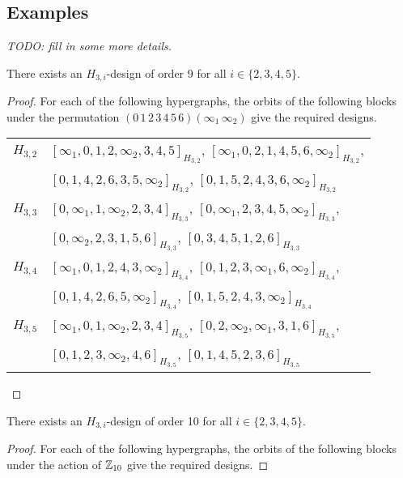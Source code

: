 \begin{subappendices}

\section{Examples} \label{section:examples}

{\em TODO: fill in some more details.}

\begin{example} \label{eg:H_3i-9}
There exists an $H_{3,i}$-design of order 9 for all $i \in \{2,3,4,5\}$.
\end{example}

\begin{proof}
For each of the following hypergraphs, the orbits of the following blocks under
the permutation $(0 \, 1 \, 2 \, 3 \, 4 \, 5 \, 6)(\infty_1 \, \infty_2)$ give the required designs.

\begin{tabular}{|c|l|}
\hline
$H_{3,2}$ &
  $[\infty_1, 0, 1, 2, \infty_2, 3, 4, 5]_{H_{3,2}}$,
  $[\infty_1, 0, 2, 1, 4, 5, 6, \infty_2]_{H_{3,2}}$, \\ &
  $[0, 1, 4, 2, 6, 3, 5, \infty_2]_{H_{3,2}}$,
  $[0, 1, 5, 2, 4, 3, 6, \infty_2]_{H_{3,2}}$
\\ \hline
$H_{3,3}$ &
  $[0, \infty_1, 1, \infty_2, 2, 3, 4]_{H_{3,3}}$,
  $[0, \infty_1, 2, 3, 4, 5, \infty_2]_{H_{3,3}}$, \\ &
  $[0, \infty_2, 2, 3, 1, 5, 6]_{H_{3,3}}$,
  $[0, 3, 4, 5, 1, 2, 6]_{H_{3,3}}$
\\ \hline
$H_{3,4}$ &
  $[\infty_1, 0, 1, 2, 4, 3, \infty_2]_{H_{3,4}}$,
  $[0, 1, 2, 3, \infty_1, 6, \infty_2]_{H_{3,4}}$, \\ &
  $[0, 1, 4, 2, 6, 5, \infty_2]_{H_{3,4}}$,
  $[0, 1, 5, 2, 4, 3, \infty_2]_{H_{3,4}}$
\\ \hline
$H_{3,5}$ &
  $[\infty_1, 0, 1, \infty_2, 2, 3, 4]_{H_{3,5}}$,
  $[0, 2, \infty_2, \infty_1, 3, 1, 6]_{H_{3,5}}$, \\ &
  $[0, 1, 2, 3, \infty_2, 4, 6]_{H_{3,5}}$,
  $[0, 1, 4, 5, 2, 3, 6]_{H_{3,5}}$
\\ \hline
\end{tabular}
\end{proof}


\begin{example} \label{eg:H_3i-10}
There exists an $H_{3,i}$-design of order 10 for all $i \in \{2,3,4,5\}$.
\end{example}

\begin{proof}
For each of the following hypergraphs, the orbits of the following blocks under
the action of $\mathbb{Z}_{10}$ give the required designs.


\end{proof}
\end{subappendices}
